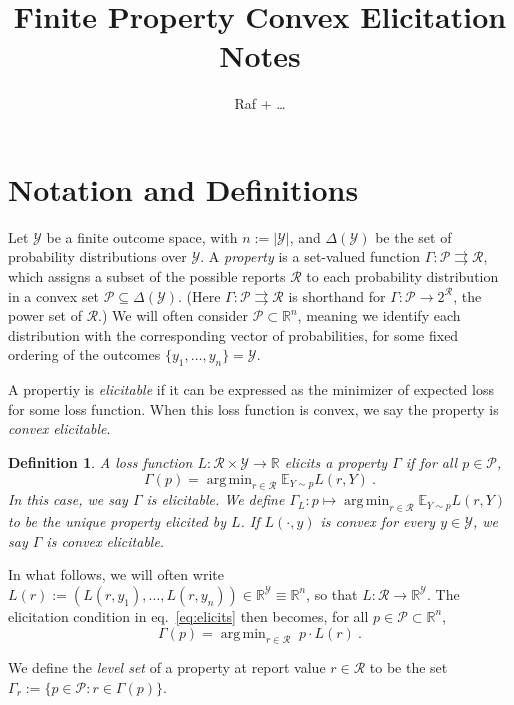 \documentclass[11pt]{article}
\title{Finite Property Convex Elicitation Notes}
\author{Raf + \ldots}
\newcommand{\reals}{\mathbb{R}}
\newcommand{\E}{\mathbb{E}}
\renewcommand{\P}{\mathcal{P}}
\newcommand{\R}{\mathcal{R}}
\newcommand{\Y}{\mathcal{Y}}
\renewcommand{\P}{\mathcal{P}}
\newcommand{\toto}{\rightrightarrows}
\DeclareMathOperator*{\argmin}{arg\,min}
\newtheorem{definition}{Definition}
\begin{document}
\maketitle

\section{Notation and Definitions}

Let $\Y$ be a finite outcome space, with $n:=|\Y|$, and $\Delta(\Y)$ be the set of probability distributions over $\Y$.
A \emph{property} is a set-valued function $\Gamma: \P \toto \R$, which assigns a subset of the possible reports $\R$ to each probability distribution in a convex set $\P \subseteq \Delta(\Y)$.
(Here $\Gamma: \P \toto \R$ is shorthand for $\Gamma: \P \to 2^\R$, the power set of $\R$.)
We will often consider $\P \subset \reals^n$, meaning we identify each distribution with the corresponding vector of probabilities, for some fixed ordering of the outcomes $\{y_1,\ldots,y_n\} = \Y$.

A propertiy is \emph{elicitable} if it can be expressed as the minimizer of expected loss for some loss function.
When this loss function is convex, we say the property is \emph{convex elicitable}.
\begin{definition}
  \label{def:elicits}
  A loss function $L: \R \times \Y \to \reals$ \emph{elicits} a property $\Gamma$ if for all $p \in \P$,
  \begin{equation}
    \label{eq:elicits}
    \Gamma(p) = \argmin_{r\in\R} \E_{Y \sim p} L(r, Y)~.
  \end{equation}
  In this case, we say $\Gamma$ is \emph{elicitable}.
  We define $\Gamma_L:p\mapsto \argmin_{r\in\R} \E_{Y \sim p} L(r, Y)$ to be the unique property elicited by $L$.
  If $L(\cdot,y)$ is convex for every $y \in \Y$, we say $\Gamma$ is \emph{convex elicitable}.
\end{definition}

In what follows, we will often write $L(r) := (L(r,y_1),\ldots,L(r,y_n)) \in \reals^\Y \equiv \reals^n$, so that $L : \R \to \reals^\Y$.
The elicitation condition in eq.~\eqref{eq:elicits} then becomes, for all $p\in\P\subset \reals^n$,
\begin{equation}
  \label{eq:elicits-vectorized}
  \Gamma(p) = \argmin_{r\in\R} \; p \cdot L(r)~.
\end{equation}

We define the \emph{level set} of a property at report value $r\in\R$ to be the set $\Gamma_r := \{p\in\P : r \in \Gamma(p)\}$.
\end{document}
